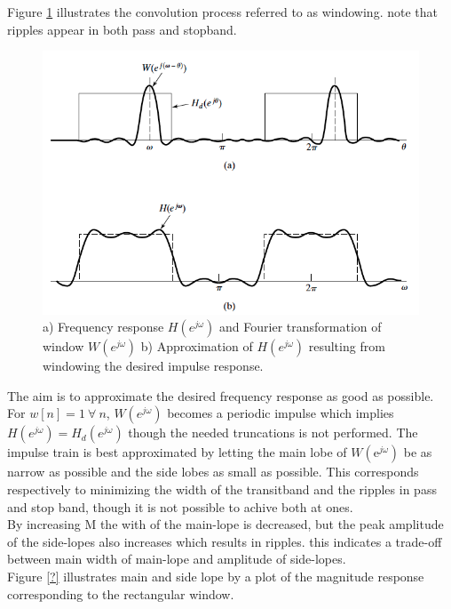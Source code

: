 Figure \ref{fig:FIR1} illustrates the convolution process referred to as windowing. note that ripples appear in both pass and stopband. 
\begin{figure}[H]
    \centering
    \includegraphics[scale=0.4]{figures/FIR1.png}
    \caption{a) Frequency response $H(e^{j\omega})$ and Fourier transformation of window $W(e^{j\omega})$ b) Approximation of $H(e^{j\omega})$ resulting from windowing the desired impulse response.}
    \label{fig:FIR1}
\end{figure}  
The aim is to approximate the desired frequency response as good as possible. For $w[n]=1 \ \forall \ n$, $W(e^{j\omega})$ becomes a periodic impulse which implies $H(e^{j\omega})=H_d(e^{j\omega})$ though the needed truncations is not performed. The impulse train is best approximated by letting the main lobe of $W(\text{e}^{j\omega})$ be as narrow as possible and the side lobes as small as possible. This corresponds respectively to minimizing the width of the transitband and the ripples in pass and stop band, though it is not possible to achive both at ones.\\
By increasing M the with of the main-lope is decreased, but the peak amplitude of the side-lopes also increases which results in ripples. this indicates a trade-off between main width of main-lope and amplitude of side-lopes. \\
Figure \ref{?} illustrates main and side lope by a plot of the magnitude response corresponding to the rectangular window.

